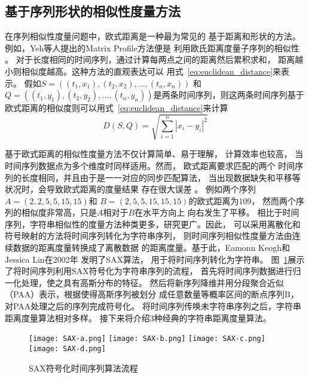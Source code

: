 \subsection{基于序列形状的相似性度量方法}
在序列相似性度量问题中，欧式距离是一种最为常见的
基于距离和形状的方法。
例如，Yeh等人提出的Matrix Profile方法便是
利用欧氏距离度量子序列的相似性
\cite{DBLP:conf/icdm/YehZUBDDSMK16}。
对于长度相同的时间序列，通过计算每两点之间的距离然后累积求和，
距离越小则相似度越高。这种方法的直观表达可以
用式~\ref{eq:euclidean_distance}来表示。
假如$S=\left(\left(t_1,x_1 \right),\left(t_2,x_2\right),\dots,\left(t_n,x_n\right)\right)$
和$Q=\left(\left(t_1,y_1 \right),\left(t_2,y_2\right),\dots,\left(t_n,y_n\right)\right)$是两条时间序列，则这两条时间序列基于欧式距离的相似度则可以用式~\ref{eq:euclidean_distance}来计算
\begin{equation}
  D\left(S,Q\right) = \sqrt{\sum_{i=1}^{n}{\left| x_{i}-y_{i} \right|^{2}}}
  \label{eq:euclidean_distance}
\end{equation}

基于欧式距离的相似性度量方法不仅计算简单、易于理解，
计算效率也较高，
当时间序列数据点为多个维度时同样适用。然而，
欧式距离要求匹配的两个
时间序列的长度相同，并且由于是一一对应的同步匹配算法，
当出现数据缺失和平移等状况时，会导致欧式距离的度量结果
存在很大误差
\cite{DBLP:journals/pvldb/DingTSWK08}。
例如两个序列$A=\left(2,2,5,5,15,15\right)$和
$B=\left(2,5,5,15,15,15\right)$的欧式距离为109，
然而两个序列的相似度非常高，只是$A$相对于$B$在水平方向上
向右发生了平移。
相比于时间序列，字符串相似性的度量方法种类更多，研究更广。因此，
可以采用离散化和符号映射的方法将时间序列转化为字符串序列，
则时间序列相似性度量方法由连续数据的距离度量转换成了离散数据
的距离度量。基于此，Eamonn Keogh和Jessica Lin在2002年
发明了SAX算法\cite{DBLP:conf/dmkd/LinKLC03}，
用于将时间序列转化为字符串。
图~\ref{fig:SAX}展示了将时间序列利用SAX符号化为字符串序列的流程，
首先将时间序列数据进行归一化处理，使之具有高斯分布的特征。
然后将新序列降维并用分段聚合近似（PAA）表示，根据使得高斯序列被划分
成任意数量等概率区间的断点序列B，对PAA处理之后的序列完成符号化。
将时间序列传唤未字符串序列之后，字符串距离度量算法相对多样。
接下来将介绍3种经典的字符串距离度量算法。
\begin{figure}
  \centering
    {\texttt{[image: SAX-a.png]}}
    {\texttt{[image: SAX-b.png]}}
    {\texttt{[image: SAX-c.png]}}
    {\texttt{[image: SAX-d.png]}}
  \caption{SAX符号化时间序列算法流程}
  \label{fig:SAX}
\end{figure}


